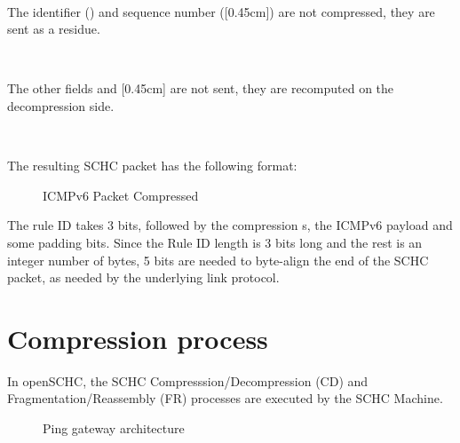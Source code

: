 ~~~

The identifier () and sequence number ([0.45cm]) are not compressed, they are sent as a residue.

~~

The other fields  and [0.45cm] are not sent, they are recomputed on the decompression side.

~~

The resulting SCHC packet has the following format:

\begin{figure}[!ht] 
\centering 

\caption{ICMPv6 Packet Compressed} 
\label{fig-residue} 
\end{figure} 

The rule ID takes 3 bits, followed by the compression s, the ICMPv6 payload and some padding bits. Since the Rule ID length is 3 bits long and the rest is an integer number of bytes, 5 bits are needed to byte-align the end of the SCHC packet, as needed by the underlying link protocol.

\section {Compression process}

In openSCHC, the SCHC Compresssion/Decompression (CD) and Fragmentation/Reassembly (FR) processes are executed by the SCHC Machine.

\begin{figure}[!ht] 
\centering 



\caption{Ping gateway architecture} 
\label{fig-schc-archi} 
\end{figure} 

